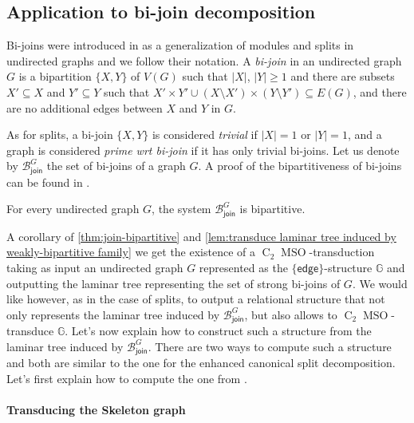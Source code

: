 \documentclass{lmcs} %
\newcommand{\MSO}{\ensuremath{\operatorname{MSO}}\xspace}
\newcommand{\CMSO}[1][]{\ensuremath{\C[#1]{\!\!}\MSO}\xspace}
\newcommand{\C}[1][]{\ensuremath{\operatorname{C}_{#1}}\xspace}
\newcommand{\edge}{\ensuremath{\mathsf{edge}}\xspace}
\newcommand{\joinSet}{\ensuremath{\mathcal{B}_\mathsf{join}^G}}
\newcommand{\card}[1]{\ensuremath{\left|#1\right|}}
\begin{document}
\subsection{Application to bi-join decomposition}
Bi-joins were introduced in \cite{MontgolfierR05,raoThesis} as a generalization of modules and splits in undirected graphs and we follow their notation. A
\emph{bi-join} in an undirected graph $G$ is a bipartition $\{X,Y\}$ of $V(G)$ such that $\card{X}$, $\card{Y}\geq 1$ and there are subsets $X'\subseteq X$ and
$Y'\subseteq Y$ such that $X'\times Y'\cup (X\setminus X')\times (Y\setminus Y')\subseteq E(G)$, and there are no additional edges between $X$ and $Y$ in $G$.

As for splits, a bi-join $\{X,Y\}$ is considered \emph{trivial} if $\card{X}=1$ or $\card{Y}=1$, and a graph is considered \emph{prime wrt bi-join} if it has only
trivial bi-joins. Let us denote by $\joinSet$ the set of bi-joins of a graph $G$.
A proof of the bipartitiveness of bi-joins can be found in
\cite{raoThesis}.

\begin{thmC}\label{thm:join-bipartitive} For every undirected graph $G$, the system $\joinSet$ is bipartitive. 
\end{thmC}

A corollary of \autoref{thm:join-bipartitive} and \autoref{lem:transduce laminar tree induced by weakly-bipartitive family} we get the existence of a \CMSO[2]-transduction taking as input an
undirected graph $G$ represented as the $\{\edge\}$-structure $\mathbb{G}$ and outputting the laminar tree representing the set of strong bi-joins of
$G$. We would like however, as in the case of splits, to output a relational structure that not only represents the laminar tree induced by $\joinSet$, but also allows to
\CMSO[2]-transduce $\mathbb{G}$. Let's now explain how to construct such a structure from the laminar tree induced by $\joinSet$.
There are two ways to compute such a structure and both are similar to the one for the enhanced canonical split decomposition. Let's first explain how to compute the one
from \cite{montgolfierThesis}.

\paragraph*{Transducing the Skeleton graph \cite{montgolfierThesis}}
\end{document}
